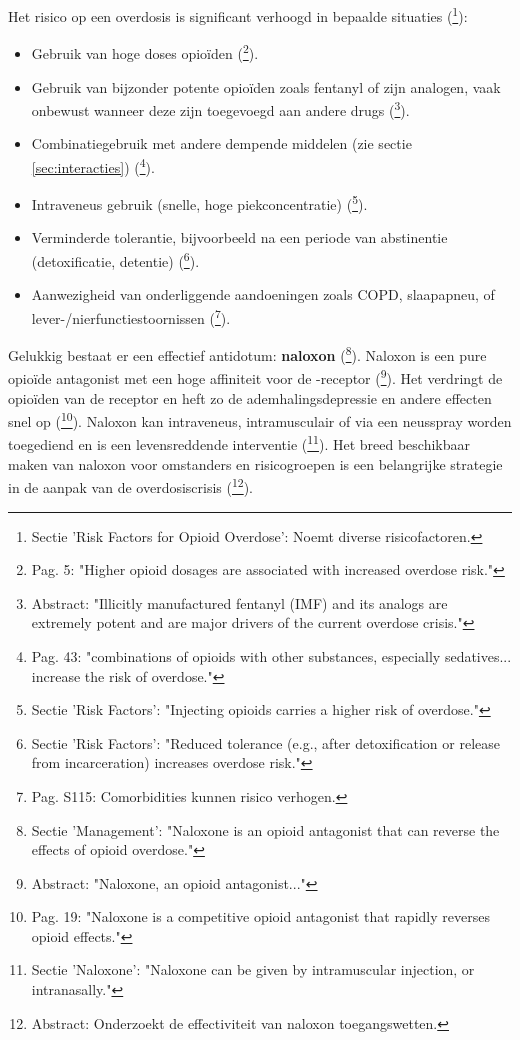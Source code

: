 \documentclass[11pt, a4paper]{report} %
\begin{document}
Het risico op een overdosis is significant verhoogd in bepaalde situaties (\cite{CDCUnderstandingEpidemic}\footnote{Sectie 'Risk Factors for Opioid Overdose': Noemt diverse risicofactoren.}):
\begin{itemize}
    \item Gebruik van hoge doses opioïden (\cite{Hooten2021OpioidsChronicPain}\footnote{Pag. 5: "Higher opioid dosages are associated with increased overdose risk."}).
    \item Gebruik van bijzonder potente opioïden zoals fentanyl of zijn analogen, vaak onbewust wanneer deze zijn toegevoegd aan andere drugs (\cite{Ciccarone2019TripleWave}\footnote{Abstract: "Illicitly manufactured fentanyl (IMF) and its analogs are extremely potent and are major drivers of the current overdose crisis."}).
    \item Combinatiegebruik met andere dempende middelen (zie sectie \ref{sec:interacties}) (\cite{Compton2021Polysubstance}\footnote{Pag. 43: "combinations of opioids with other substances, especially sedatives... increase the risk of overdose."}).
    \item Intraveneus gebruik (snelle, hoge piekconcentratie) (\cite{WHO2023Opioid}\footnote{Sectie 'Risk Factors': "Injecting opioids carries a higher risk of overdose."}).
    \item Verminderde tolerantie, bijvoorbeeld na een periode van abstinentie (detoxificatie, detentie) (\cite{CDCPreventingOverdose}\footnote{Sectie 'Risk Factors': "Reduced tolerance (e.g., after detoxification or release from incarceration) increases overdose risk."}).
    \item Aanwezigheid van onderliggende aandoeningen zoals COPD, slaapapneu, of lever-/nierfunctiestoornissen (\cite{Benyamin2008OpioidComplications}\footnote{Pag. S115: Comorbidities kunnen risico verhogen.}).
\end{itemize}
Gelukkig bestaat er een effectief antidotum: \textbf{naloxon} (\cite{WHO2023Opioid}\footnote{Sectie 'Management': "Naloxone is an opioid antagonist that can reverse the effects of opioid overdose."}). Naloxon is een pure opioïde antagonist met een hoge affiniteit voor de \textmu-receptor (\cite{Deng2020TowardsBetterOpioidAntagonistsRL}\footnote{Abstract: "Naloxone, an opioid antagonist..."}). Het verdringt de opioïden van de receptor en heft zo de ademhalingsdepressie en andere effecten snel op (\cite{Kosten2002NeurobiologyDependence}\footnote{Pag. 19: "Naloxone is a competitive opioid antagonist that rapidly reverses opioid effects."}). Naloxon kan intraveneus, intramusculair of via een neusspray worden toegediend en is een levensreddende interventie (\cite{CDCPreventingOverdose}\footnote{Sectie 'Naloxone': "Naloxone can be given by intramuscular injection, or intranasally."}). Het breed beschikbaar maken van naloxon voor omstanders en risicogroepen is een belangrijke strategie in de aanpak van de overdosiscrisis (\cite{Smart2020NaloxoneAccessLaws}\footnote{Abstract: Onderzoekt de effectiviteit van naloxon toegangswetten.}).
\end{document}
